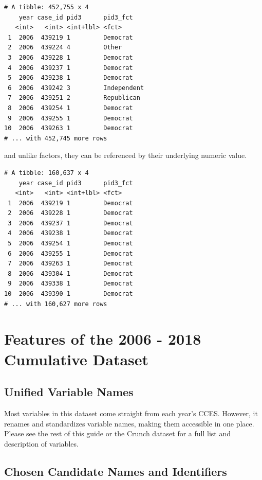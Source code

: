 \documentclass[10pt,article,oneside]{memoir}
\theoremstyle{definition}
\begin{document}
\begin{verbatim}
# A tibble: 452,755 x 4
    year case_id pid3      pid3_fct   
   <int>   <int> <int+lbl> <fct>      
 1  2006  439219 1         Democrat   
 2  2006  439224 4         Other      
 3  2006  439228 1         Democrat   
 4  2006  439237 1         Democrat   
 5  2006  439238 1         Democrat   
 6  2006  439242 3         Independent
 7  2006  439251 2         Republican 
 8  2006  439254 1         Democrat   
 9  2006  439255 1         Democrat   
10  2006  439263 1         Democrat   
# ... with 452,745 more rows
\end{verbatim}

and unlike factors, they can be referenced by their underlying numeric
value.

\begin{verbatim}
# A tibble: 160,637 x 4
    year case_id pid3      pid3_fct
   <int>   <int> <int+lbl> <fct>   
 1  2006  439219 1         Democrat
 2  2006  439228 1         Democrat
 3  2006  439237 1         Democrat
 4  2006  439238 1         Democrat
 5  2006  439254 1         Democrat
 6  2006  439255 1         Democrat
 7  2006  439263 1         Democrat
 8  2006  439304 1         Democrat
 9  2006  439338 1         Democrat
10  2006  439390 1         Democrat
# ... with 160,627 more rows
\end{verbatim}

\newpage

\hypertarget{features-of-the-2006---2018-cumulative-dataset}{%
\section{Features of the 2006 - 2018 Cumulative
Dataset}\label{features-of-the-2006---2018-cumulative-dataset}}

\hypertarget{unified-variable-names}{%
\subsection{Unified Variable Names}\label{unified-variable-names}}

Most variables in this dataset come straight from each year's CCES.
However, it renames and standardizes variable names, making them
accessible in one place. Please see the rest of this guide or the Crunch
dataset for a full list and description of variables.

\hypertarget{chosen-candidate-names-and-identifiers}{%
\subsection{Chosen Candidate Names and
Identifiers}\label{chosen-candidate-names-and-identifiers}}
\end{document}

